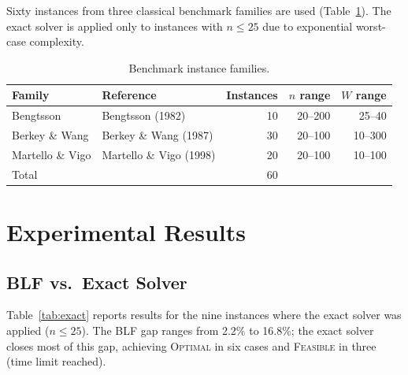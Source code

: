\documentclass[11pt,a4paper]{article}
\begin{document}
Sixty instances from three classical benchmark families are used
(Table~\ref{tab:benchmarks}).
The exact solver is applied only to instances with $n \le 25$ due to
exponential worst-case complexity.

\begin{table}[h]
\centering
\caption{Benchmark instance families.}
\label{tab:benchmarks}
\begin{tabular}{llrrr}
\toprule
Family & Reference & Instances & $n$ range & $W$ range \\
\midrule
Bengtsson      & Bengtsson (1982)       & 10 & 20--200 & 25--40  \\
Berkey \& Wang & Berkey \& Wang (1987)  & 30 & 20--100 & 10--300 \\
Martello \& Vigo & Martello \& Vigo (1998) & 20 & 20--100 & 10--100 \\
\midrule
Total & & 60 & & \\
\bottomrule
\end{tabular}
\end{table}

\section{Experimental Results}

\subsection{BLF vs.\ Exact Solver}

Table~\ref{tab:exact} reports results for the nine instances where the exact
solver was applied ($n \le 25$).
The BLF gap ranges from 2.2\% to 16.8\%;
the exact solver closes most of this gap, achieving \textsc{Optimal} in six
cases and \textsc{Feasible} in three (time limit reached).
\end{document}
